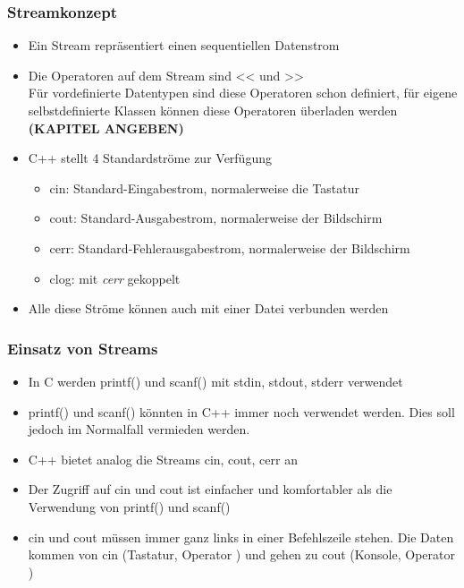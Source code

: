 \subsubsection{Streamkonzept\hfill}
\label{sec:unterunterabschnitt}
\begin{itemize}
	\item Ein Stream repräsentiert einen sequentiellen Datenstrom
	\item Die Operatoren auf dem Stream sind << und >>
		\\ Für vordefinierte Datentypen sind diese Operatoren schon definiert, für eigene selbstdefinierte Klassen können diese Operatoren überladen werden \textbf{\color{\ownRed}(KAPITEL ANGEBEN)}\color{black}
	\item C++ stellt 4 Standardströme zur Verfügung
	\begin{itemize}
		\item cin:	Standard-Eingabestrom, normalerweise die Tastatur
		\item cout:	Standard-Ausgabestrom, normalerweise der Bildschirm
		\item cerr:	Standard-Fehlerausgabestrom, normalerweise der Bildschirm
		\item clog: mit \emph{cerr} gekoppelt
	\end{itemize}
	\item Alle diese Ströme können auch mit einer Datei verbunden werden
\end{itemize}

\subsubsection{Einsatz von Streams\hfill}
\label{sec:unterunterabschnitt}
\begin{itemize}
	\item In C werden printf() und scanf() mit stdin, stdout, stderr verwendet
	\item printf() und scanf() könnten in C++ immer noch verwendet werden. Dies soll jedoch im Normalfall vermieden werden.
	\item C++ bietet analog die Streams cin, cout, cerr an
	\item Der Zugriff auf cin und cout ist einfacher und komfortabler als die Verwendung von printf() und scanf()
	\item cin und cout müssen immer ganz links in einer Befehlszeile stehen. Die Daten kommen von cin (Tastatur, Operator \frq\frq) und gehen zu cout (Konsole, Operator \flq\flq)
\end{itemize}

